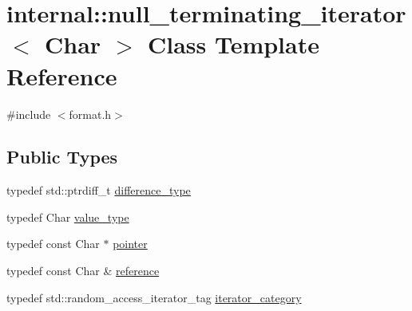 \hypertarget{classinternal_1_1null__terminating__iterator}{}\section{internal\+:\+:null\+\_\+terminating\+\_\+iterator$<$ Char $>$ Class Template Reference}
\label{classinternal_1_1null__terminating__iterator}


{\ttfamily \#include $<$format.\+h$>$}

\subsection*{Public Types}
\begin{DoxyCompactItemize}
\item 
typedef std\+::ptrdiff\+\_\+t \hyperlink{classinternal_1_1null__terminating__iterator_ad1a2aa728f679bdfdbdc644f1c43e819}{difference\+\_\+type}
\item 
typedef Char \hyperlink{classinternal_1_1null__terminating__iterator_a2c62d4a63a2a56950937b1971c306273}{value\+\_\+type}
\item 
typedef const Char $\ast$ \hyperlink{classinternal_1_1null__terminating__iterator_a5ed00a6d847c29fdfa568e62d1c970c7}{pointer}
\item 
typedef const Char \& \hyperlink{classinternal_1_1null__terminating__iterator_ae7aa95cd6c1413d74515a1dbcf21e040}{reference}
\item 
typedef std\+::random\+\_\+access\+\_\+iterator\+\_\+tag \hyperlink{classinternal_1_1null__terminating__iterator_aacbf363b5bfc474bd81d5710a1362c90}{iterator\+\_\+category}
\end{DoxyCompactItemize}
